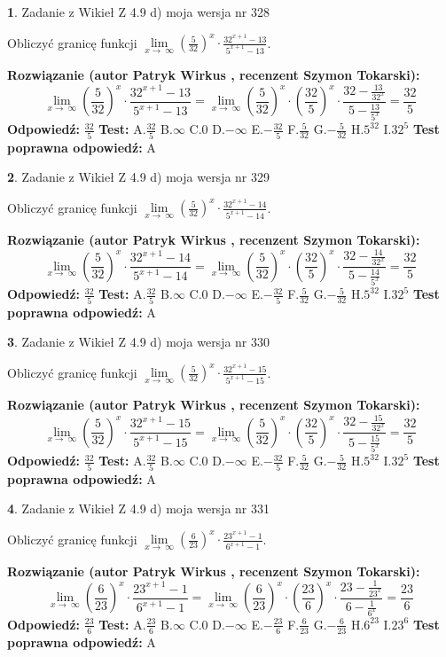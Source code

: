 \documentclass[12pt, a4paper]{article}
\theoremstyle{definition} %
\newtheorem{zad}{}
\newcommand{\zadStart}[1]{\begin{zad}#1\newline}
\newcommand{\zadStop}{\end{zad}}
\newcommand{\rozwStart}[2]{\noindent \textbf{Rozwiązanie (autor #1 , recenzent #2): }\newline}
\newcommand{\rozwStop}{\newline}
\newcommand{\odpStart}{\noindent \textbf{Odpowiedź:}\newline}
\newcommand{\odpStop}{\newline}
\newcommand{\testStart}{\noindent \textbf{Test:}\newline}
\newcommand{\testStop}{\newline}
\newcommand{\kluczStart}{\noindent \textbf{Test poprawna odpowiedź:}\newline}
\newcommand{\kluczStop}{\newline}
\begin{document}
\zadStart{Zadanie z Wikieł Z 4.9 d) moja wersja nr 328}


Obliczyć granicę funkcji  $\lim\limits_{x\to\ \infty}(\frac{5}{32})^{x}\cdot\frac{32^{x+1}-13}{5^{x+1}-13}$.
\zadStop
\rozwStart{Patryk Wirkus}{Szymon Tokarski}
$$\lim\limits_{x\to\ \infty}(\frac{5}{32})^{x}\cdot\frac{32^{x+1}-13}{5^{x+1}-13}=\lim\limits_{x\to\ \infty}(\frac{5}{32})^{x}\cdot(\frac{32}{5})^{x} \cdot \frac{32-\frac{13}{32^{x}}}{5-\frac{13}{5^{x}}} = \frac{32}{5}$$
\rozwStop
\odpStart
$\frac{32}{5}$
\odpStop
\testStart
A.$\frac{32}{5}$ B.$\infty$ C.$0$ D.$-\infty$ E.$-\frac{32}{5}$
F.$\frac{5}{32}$ G.$-\frac{5}{32}$
H.$5^{32}$
I.$32^{5}$
\testStop
\kluczStart
A
\kluczStop



\zadStart{Zadanie z Wikieł Z 4.9 d) moja wersja nr 329}


Obliczyć granicę funkcji  $\lim\limits_{x\to\ \infty}(\frac{5}{32})^{x}\cdot\frac{32^{x+1}-14}{5^{x+1}-14}$.
\zadStop
\rozwStart{Patryk Wirkus}{Szymon Tokarski}
$$\lim\limits_{x\to\ \infty}(\frac{5}{32})^{x}\cdot\frac{32^{x+1}-14}{5^{x+1}-14}=\lim\limits_{x\to\ \infty}(\frac{5}{32})^{x}\cdot(\frac{32}{5})^{x} \cdot \frac{32-\frac{14}{32^{x}}}{5-\frac{14}{5^{x}}} = \frac{32}{5}$$
\rozwStop
\odpStart
$\frac{32}{5}$
\odpStop
\testStart
A.$\frac{32}{5}$ B.$\infty$ C.$0$ D.$-\infty$ E.$-\frac{32}{5}$
F.$\frac{5}{32}$ G.$-\frac{5}{32}$
H.$5^{32}$
I.$32^{5}$
\testStop
\kluczStart
A
\kluczStop



\zadStart{Zadanie z Wikieł Z 4.9 d) moja wersja nr 330}


Obliczyć granicę funkcji  $\lim\limits_{x\to\ \infty}(\frac{5}{32})^{x}\cdot\frac{32^{x+1}-15}{5^{x+1}-15}$.
\zadStop
\rozwStart{Patryk Wirkus}{Szymon Tokarski}
$$\lim\limits_{x\to\ \infty}(\frac{5}{32})^{x}\cdot\frac{32^{x+1}-15}{5^{x+1}-15}=\lim\limits_{x\to\ \infty}(\frac{5}{32})^{x}\cdot(\frac{32}{5})^{x} \cdot \frac{32-\frac{15}{32^{x}}}{5-\frac{15}{5^{x}}} = \frac{32}{5}$$
\rozwStop
\odpStart
$\frac{32}{5}$
\odpStop
\testStart
A.$\frac{32}{5}$ B.$\infty$ C.$0$ D.$-\infty$ E.$-\frac{32}{5}$
F.$\frac{5}{32}$ G.$-\frac{5}{32}$
H.$5^{32}$
I.$32^{5}$
\testStop
\kluczStart
A
\kluczStop



\zadStart{Zadanie z Wikieł Z 4.9 d) moja wersja nr 331}


Obliczyć granicę funkcji  $\lim\limits_{x\to\ \infty}(\frac{6}{23})^{x}\cdot\frac{23^{x+1}-1}{6^{x+1}-1}$.
\zadStop
\rozwStart{Patryk Wirkus}{Szymon Tokarski}
$$\lim\limits_{x\to\ \infty}(\frac{6}{23})^{x}\cdot\frac{23^{x+1}-1}{6^{x+1}-1}=\lim\limits_{x\to\ \infty}(\frac{6}{23})^{x}\cdot(\frac{23}{6})^{x} \cdot \frac{23-\frac{1}{23^{x}}}{6-\frac{1}{6^{x}}} = \frac{23}{6}$$
\rozwStop
\odpStart
$\frac{23}{6}$
\odpStop
\testStart
A.$\frac{23}{6}$ B.$\infty$ C.$0$ D.$-\infty$ E.$-\frac{23}{6}$
F.$\frac{6}{23}$ G.$-\frac{6}{23}$
H.$6^{23}$
I.$23^{6}$
\testStop
\kluczStart
A
\kluczStop
\end{document}
